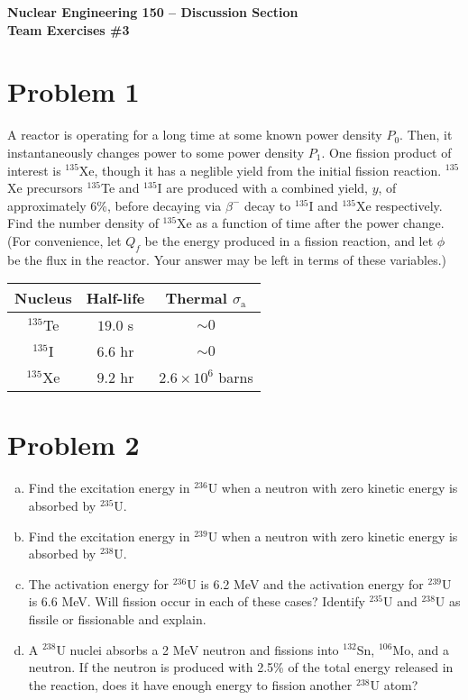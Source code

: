 \documentclass{report}
\begin{document}
\begin{center}
\textbf{\large Nuclear Engineering 150 -- Discussion Section}\\ 
\textbf{Team Exercises \#3}
\end{center}

\section*{Problem 1}

A reactor is operating for a long time at some known power density $P_0$. Then, it instantaneously changes power to some power density $P_1$. One fission product of interest is $^{135}$Xe, though it has a neglible yield from the initial fission reaction. $^{135}$Xe precursors $^{135}$Te and $^{135}$I are produced with a combined yield, $y$, of approximately 6\%, before decaying via $\beta^{-}$ decay to $^{135}$I and $^{135}$Xe respectively. Find the number density of $^{135}$Xe as a function of time after the power change. (For convenience, let $Q_f$ be the energy produced in a fission reaction, and let $\phi$ be the flux in the reactor. Your answer may be left in terms of these variables.)

\begin{table}[htbp]
	\centering
	\begin{tabular}{|c|c|c|}
			\hline
			Nucleus		&	Half-life 	& Thermal $\sigma_{\text{a}}$ \\
			\hline
			$^{135}$Te	&  $19.0$ s 	& $\sim 0$\\
			$^{135}$I	&  $6.6$ hr 	& $\sim 0$\\
			$^{135}$Xe	&  $9.2$ hr 	& $2.6 \times 10^6$ barns \\
			\hline
	\end{tabular}
	\label{tab:design-specs}
\end{table}


\newpage
\section*{Problem 2}

\begin{enumerate}[a)]
\item Find the excitation energy in $^{236}$U when a neutron with zero kinetic energy is absorbed by $^{235}$U. 
\item Find the excitation energy in $^{239}$U when a neutron with zero kinetic energy is absorbed by $^{238}$U. 
\item The activation energy for $^{236}$U is 6.2 MeV and the activation energy for $^{239}$U is 6.6 MeV. Will fission occur in each of these cases? Identify $^{235}$U and $^{238}$U as fissile or fissionable and explain.
\item A $^{238}$U nuclei absorbs a 2 MeV neutron and fissions into $^{132}$Sn, $^{106}$Mo, and a neutron. If the neutron is produced with 2.5\% of the total energy released in the reaction, does it have enough energy to fission another $^{238}$U atom?
\end{enumerate}
\end{document}
